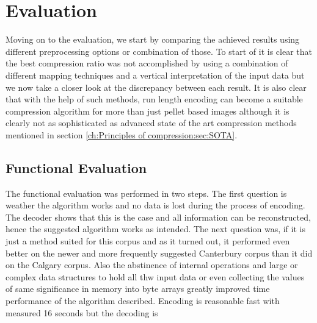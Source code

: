 
\chapter{Evaluation}
\label{ch:Evaluation}
Moving on to the evaluation, we start by comparing the achieved results using different preprocessing options or combination of those. To start of it is clear that the best compression ratio was not accomplished by using a combination of different mapping techniques and a vertical interpretation of the input data but we now take a closer look at the discrepancy between each result. It is also clear that with the help of such methods, run length encoding can become a suitable compression algorithm for more than just pellet based images although it is clearly not as sophisticated as advanced state of the art compression methods mentioned in section \ref{ch:Principles of compression:sec:SOTA}.

\section{Functional Evaluation}
\label{ch:Evaluation:sec:Functional Evaluation}
\par{
The functional evaluation was performed in two steps. The first question is weather the algorithm works and no data is lost during the process of encoding. The decoder shows that this is the case and all information can be reconstructed, hence the suggested algorithm works as intended. The next question was, if it is just a method suited for this corpus and as it turned out, it performed even better on the newer and more frequently suggested Canterbury corpus than it did on the Calgary corpus. Also the abstinence of internal operations and large or complex data structures to hold all thw input data or even collecting the values of same significance in memory into byte arrays greatly improved time performance of the algorithm described. Encoding is reasonable fast with measured 16 seconds but the decoding is  
}

